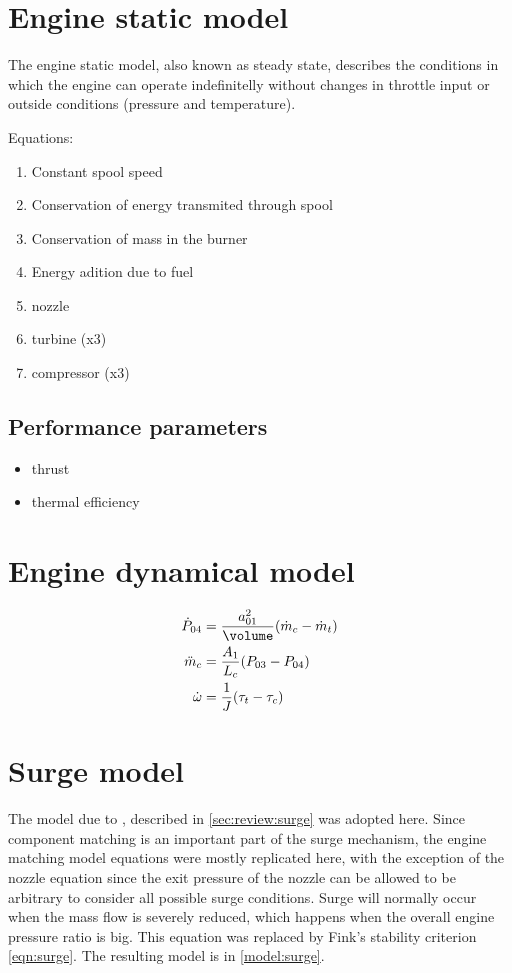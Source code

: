 \documentclass[tcc]{subfiles}
\begin{document}



\section{Engine static model}


The engine static model, also known as steady state, 
describes the conditions in which the engine can operate indefinitelly 
without changes in throttle input or outside conditions (pressure and temperature).


Equations:
\begin{enumerate}
    \item Constant spool speed
    \item Conservation of energy transmited through spool
    \item Conservation of mass in the burner
    \item Energy adition due to fuel
    \item nozzle
    \item turbine (x3)
    \item compressor (x3)
\end{enumerate}



\subsection{Performance parameters}
\begin{itemize}
    \item thrust
    \item thermal efficiency
\end{itemize}

\section{Engine dynamical model}
\begin{align}
    \dot{P}_{04} &= \frac{a_{01}^2}{\volume}(\dot{m}_c - \dot{m}_t) \\
    \ddot{m}_c &= \frac{A_1}{L_c}(P_{03}-P_{04}) \\
    \dot{\omega} &= \frac{1}{J} (\tau_t-\tau_c)
\end{align}

\section{Surge model}

The model due to \textcite{Finsk}, described in \cref{sec:review:surge} was adopted here. 
Since component matching is an important part of the surge mechanism, the engine matching model equations were mostly replicated here, with the exception of the nozzle equation since the exit pressure of the nozzle can be allowed to be arbitrary to consider all possible surge conditions. Surge will normally occur when the mass flow is severely reduced, which happens when the overall engine pressure ratio is big. This equation was replaced by Fink's stability criterion \cref{eqn:surge}. The resulting model is in \cref{model:surge}.
\end{document}
